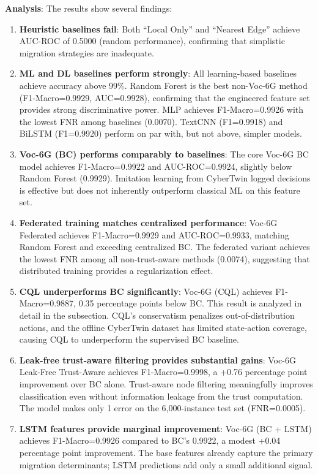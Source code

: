 \documentclass[10pt,letterpaper]{article}
\providecommand{\VocSixG}{Voc-6G}
\begin{document}
\textbf{Analysis}: The results show several findings:

\begin{enumerate}
    \item \textbf{Heuristic baselines fail}: Both ``Local Only'' and ``Nearest Edge'' achieve AUC-ROC of 0.5000 (random performance), confirming that simplistic migration strategies are inadequate.

    \item \textbf{ML and DL baselines perform strongly}: All learning-based baselines achieve accuracy above 99\%. Random Forest is the best non-\VocSixG{} method (F1-Macro=0.9929, AUC=0.9928), confirming that the engineered feature set provides strong discriminative power. MLP achieves F1-Macro=0.9926 with the lowest FNR among baselines (0.0070). TextCNN (F1=0.9918) and BiLSTM (F1=0.9920) perform on par with, but not above, simpler models.

    \item \textbf{Voc-6G (BC) performs comparably to baselines}: The core \VocSixG{} BC model achieves F1-Macro=0.9922 and AUC-ROC=0.9924, slightly below Random Forest (0.9929). Imitation learning from CyberTwin logged decisions is effective but does not inherently outperform classical ML on this feature set.

    \item \textbf{Federated training matches centralized performance}: \VocSixG{} Federated achieves F1-Macro=0.9929 and AUC-ROC=0.9933, matching Random Forest and exceeding centralized BC. The federated variant achieves the lowest FNR among all non-trust-aware methods (0.0074), suggesting that distributed training provides a regularization effect.

    \item \textbf{CQL underperforms BC significantly}: \VocSixG{} (CQL) achieves F1-Macro=0.9887, 0.35 percentage points below BC. This result is analyzed in detail in the  subsection. CQL's conservatism penalizes out-of-distribution actions, and the offline CyberTwin dataset has limited state-action coverage, causing CQL to underperform the supervised BC baseline.

    \item \textbf{Leak-free trust-aware filtering provides substantial gains}: \VocSixG{} Leak-Free Trust-Aware achieves F1-Macro=0.9998, a +0.76 percentage point improvement over BC alone. Trust-aware node filtering meaningfully improves classification even without information leakage from the trust computation. The model makes only 1 error on the 6,000-instance test set (FNR=0.0005).

    \item \textbf{LSTM features provide marginal improvement}: \VocSixG{} (BC + LSTM) achieves F1-Macro=0.9926 compared to BC's 0.9922, a modest +0.04 percentage point improvement. The base features already capture the primary migration determinants; LSTM predictions add only a small additional signal.
\end{enumerate}
\end{document}
